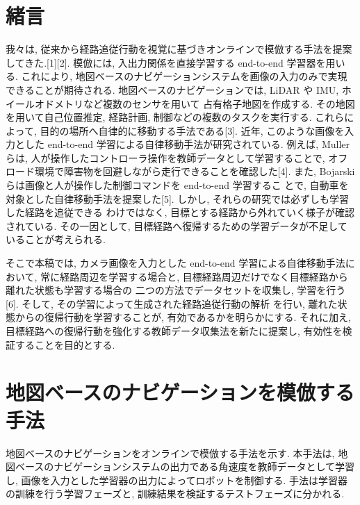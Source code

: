 \documentclass{jarticle}
\begin{document}
\date{} 

\maketitle
\thispagestyle{empty}
\pagestyle{empty}

\small

\section{緒言}
我々は, 従来から経路追従行動を視覚に基づきオンラインで模倣する手法を提案してきた.[1][2].
模倣には, 入出力関係を直接学習する end-to-end 学習器を用いる.
これにより, 地図ベースのナビゲーションシステムを画像の入力のみで実現できることが期待される.
地図ベースのナビゲーションでは, LiDAR や IMU, ホイールオドメトリなど複数のセンサを用いて
占有格子地図を作成する.
その地図を用いて自己位置推定, 経路計画, 制御などの複数のタスクを実行する.
これらによって, 目的の場所へ自律的に移動する手法である[3].
近年, このような画像を入力とした end-to-end 学習による自律移動手法が研究されている.
例えば, Muller らは, 人が操作したコントローラ操作を教師データとして学習することで, 
オフロード環境で障害物を回避しながら走行できることを確認した[4].
また, Bojarski らは画像と人が操作した制御コマンドを end-to-end 学習するこ
とで, 自動車を対象とした自律移動手法を提案した[5].
しかし, それらの研究では必ずしも学習した経路を追従できる
わけではなく, 目標とする経路から外れていく様子が確認されている.
その一因として, 目標経路へ復帰するための学習データが不足していることが考えられる.

そこで本稿では, カメラ画像を入力とした end-to-end 学習による自律移動手法において,
常に経路周辺を学習する場合と, 目標経路周辺だけでなく目標経路から離れた状態も学習する場合の
二つの方法でデータセットを収集し, 学習を行う[6]. そして, その学習によって生成された経路追従行動の解析
を行い, 離れた状態からの復帰行動を学習することが, 有効であるかを明らかにする. それに加え, 
目標経路への復帰行動を強化する教師データ収集法を新たに提案し, 有効性を検証することを目的とする.

 
\section{地図ベースのナビゲーションを模倣する手法}
地図ベースのナビゲーションをオンラインで模倣する手法を示す.
本手法は, 地図ベースのナビゲーションシステムの出力である角速度を教師データとして学習し, 
画像を入力とした学習器の出力によってロボットを制御する. 
手法は学習器の訓練を行う学習フェーズと, 訓練結果を検証するテストフェーズに分かれる.
\end{document}
